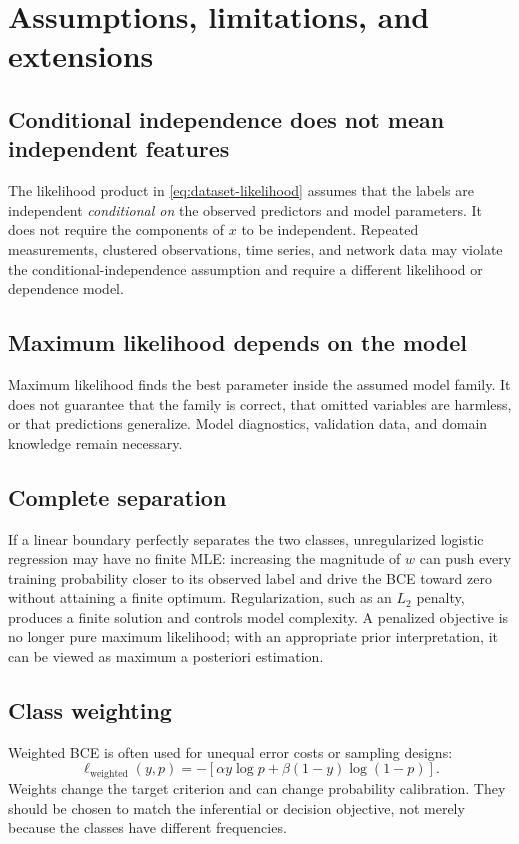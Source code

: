 \documentclass[11pt]{article}
\theoremstyle{definition}
\begin{document}
\section{Assumptions, limitations, and extensions}

\subsection{Conditional independence does not mean independent features}

The likelihood product in \cref{eq:dataset-likelihood} assumes that the labels are independent \emph{conditional on} the observed predictors and model parameters. It does not require the components of $x$ to be independent. Repeated measurements, clustered observations, time series, and network data may violate the conditional-independence assumption and require a different likelihood or dependence model.

\subsection{Maximum likelihood depends on the model}

Maximum likelihood finds the best parameter inside the assumed model family. It does not guarantee that the family is correct, that omitted variables are harmless, or that predictions generalize. Model diagnostics, validation data, and domain knowledge remain necessary.

\subsection{Complete separation}

If a linear boundary perfectly separates the two classes, unregularized logistic regression may have no finite MLE: increasing the magnitude of $w$ can push every training probability closer to its observed label and drive the BCE toward zero without attaining a finite optimum. Regularization, such as an $L_2$ penalty, produces a finite solution and controls model complexity. A penalized objective is no longer pure maximum likelihood; with an appropriate prior interpretation, it can be viewed as maximum a posteriori estimation.

\subsection{Class weighting}

Weighted BCE is often used for unequal error costs or sampling designs:
\[
\ell_{\mathrm{weighted}}(y,p)
=-\left[\alpha y\log p+\beta(1-y)\log(1-p)\right].
\]
Weights change the target criterion and can change probability calibration. They should be chosen to match the inferential or decision objective, not merely because the classes have different frequencies.
\end{document}
